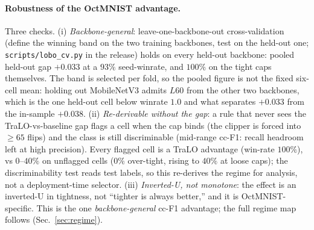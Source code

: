 \documentclass[10pt]{article}
\begin{document}
\paragraph{Robustness of the OctMNIST advantage.}
Three checks. (i) \emph{Backbone-general}: leave-one-backbone-out
cross-validation (define the winning band on the two training backbones,
test on the held-out one; {\texttt{scripts/lobo\_cv.py}
in the release}) holds on every
held-out backbone: pooled held-out gap $+0.033$ at a $93\%$ seed-winrate,
and $100\%$ on the tight caps themselves{. The band is selected per
fold, so the pooled figure is not the fixed six-cell mean: holding out
MobileNetV3 admits $L60$ from the other two backbones, which is the one
held-out cell below winrate $1.0$ and what separates $+0.033$ from the
in-sample $+0.038$}. (ii) \emph{Re-derivable without
the gap}: a rule that never sees the TraLO-vs-baseline gap flags a cell
when the cap binds (the clipper is forced into $\ge 65$ flips) and the
class is still discriminable (mid-range cc-F1: recall headroom left at
high precision). Every flagged cell is a TraLO advantage
(win-rate $100\%$), vs $0$--$40\%$ on unflagged cells ($0\%$ over-tight,
rising to $40\%$ at loose caps); the discriminability test reads test
labels, so this re-derives the regime for analysis, not a deployment-time
selector. (iii) \emph{Inverted-U, not monotone}: the effect is an
inverted-U in tightness, not ``tighter is always better,'' and it is
OctMNIST-specific. This is the one \emph{backbone-general} cc-F1
advantage; the full regime map follows (Sec.~\ref{sec:regime}).
\end{document}
